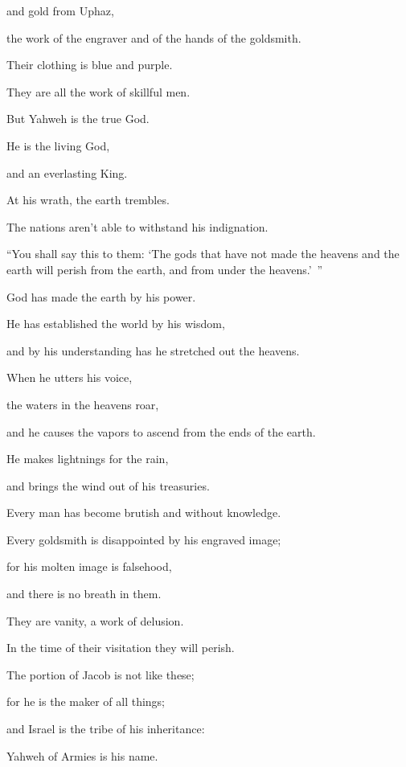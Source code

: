 {\par }{\QB and gold from Uphaz,
\par }{\QB the work of the engraver and of the hands of the goldsmith.
\par }{\Q Their clothing is blue and purple.
\par }{\QB They are all the work of skillful men.
\par }{\Q {}But Yahweh is the true God.
\par }{\QB He is the living God,
\par }{\QB and an everlasting King.
\par }{\Q At his wrath, the earth trembles.
\par }{\QB The nations aren’t able to withstand his indignation.
\par }{\PP {}“You shall say this to them: ‘The gods that have not made the heavens and the earth will perish from the earth, and from under the heavens.’ ”
\par }{\Q {}God has made the earth by his power.
\par }{\QB He has established the world by his wisdom,
\par }{\QB and by his understanding has he stretched out the heavens.
\par }{\Q {}When he utters his voice,
\par }{\QB the waters in the heavens roar,
\par }{\QB and he causes the vapors to ascend from the ends of the earth.
\par }{\Q He makes lightnings for the rain,
\par }{\QB and brings the wind out of his treasuries.
\par }{\Q {}Every man has become brutish and without knowledge.
\par }{\QB Every goldsmith is disappointed by his engraved image;
\par }{\Q for his molten image is falsehood,
\par }{\QB and there is no breath in them.
\par }{\Q {}They are vanity, a work of delusion.
\par }{\QB In the time of their visitation they will perish.
\par }{\Q {}The portion of Jacob is not like these;
\par }{\QB for he is the maker of all things;
\par }{\Q and Israel is the tribe of his inheritance:
\par }{\QB Yahweh of Armies is his name.
}
